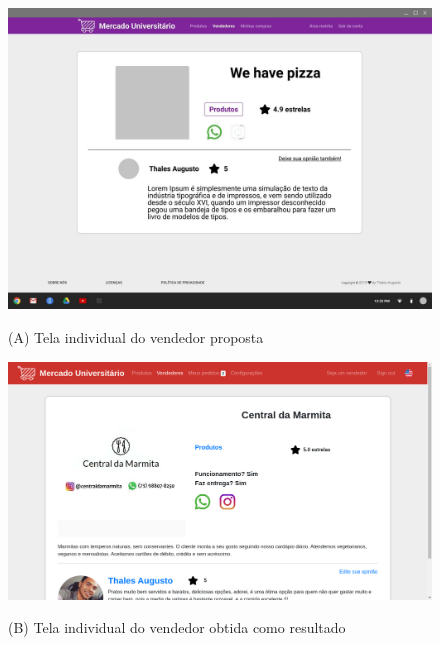 \begin{figure}[htbp!]
  \centering
  \caption{(A) Tela individual do vendedor proposta}
  \includegraphics[width=1\textwidth]{figs/mockup/vendedor.jpg}
    \label{fig:err}
\end{figure}

\begin{figure}[htbp!]
  \centering
  \caption{(B) Tela individual do vendedor obtida como resultado}
  \includegraphics[width=1\textwidth]{figs/resultado/vendedor.png}
    \label{fig:err}
\end{figure}

